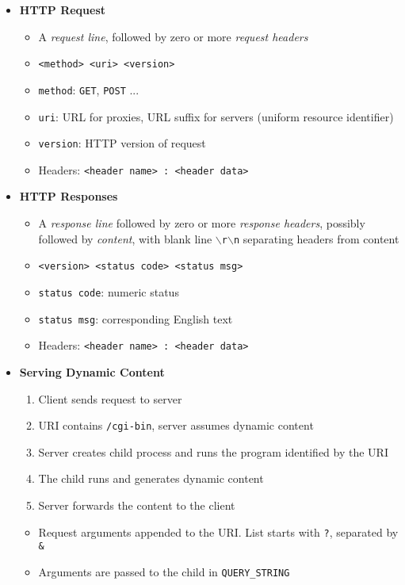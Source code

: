 \documentclass[12pt]{article}
\begin{document}
{\begin{itemize}
\begin{itemize}
	\end{itemize}
	\item \textbf{HTTP Request}
	\begin{itemize}
		\item A \textit{request line}, followed by zero or more \textit{request headers}
		\item \texttt{<method> <uri> <version>}
		\item \texttt{method}: \texttt{GET}, \texttt{POST} ...
		\item \texttt{uri}: URL for proxies, URL suffix for servers (uniform resource identifier)
		\item \texttt{version}: HTTP version of request
		\item Headers: \texttt{<header name> : <header data>}
	\end{itemize}	
	\item \textbf{HTTP Responses}
	\begin{itemize}
		\item A \textit{response line} followed by zero or more \textit{response headers}, possibly followed by \textit{content}, with blank line \texttt{$\backslash$r$\backslash$n} separating headers from content
		\item \texttt{<version> <status code> <status msg>}
		\item \texttt{status code}: numeric status
		\item \texttt{status msg}: corresponding English text
		\item Headers: \texttt{<header name> : <header data>}
	\end{itemize}
	\item \textbf{Serving Dynamic Content}
	\begin{enumerate}
		\item Client sends request to server
		\item URI contains \texttt{/cgi-bin}, server assumes dynamic content
		\item Server creates child process and runs the program identified by the URI
		\item The child runs and generates dynamic content
		\item Server forwards the content to the client
	\end{enumerate}
	\begin{itemize}
		\item Request arguments appended to the URI. List starts with \texttt{?}, separated by \texttt{\&}
		\item Arguments are passed to the child in \texttt{QUERY\_STRING}

\end{itemize}
\end{itemize}}
\end{document}
